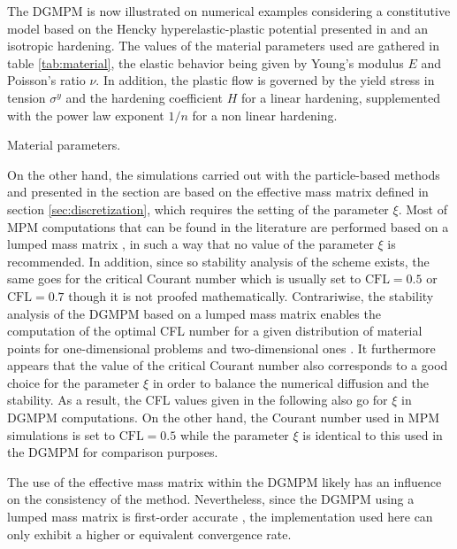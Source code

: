 The DGMPM is now illustrated on numerical examples considering a constitutive model based on the Hencky hyperelastic-plastic potential presented in \cite{Laurent2009} and an isotropic hardening. 
The values of the material parameters used are gathered in table \ref{tab:material}, the elastic behavior being given by Young's modulus $E$ and Poisson's ratio $\nu$. 
In addition, the plastic flow is governed by the yield stress in tension $\sigma^y$ and the hardening coefficient $H$ for a linear hardening, supplemented with the power law exponent $1/n$ for a non linear hardening.
\begin{table}[h!]
  \centering
  
  \caption{Material parameters.}
  \label{tab:material}
\end{table}

On the other hand, the simulations carried out with the particle-based methods and presented in the section are based on the effective mass matrix defined in section \ref{sec:discretization}, which requires the setting of the parameter $\xi$.
Most of MPM computations that can be found in the literature are performed based on a lumped mass matrix \cite{Sulsky94,Sulsky95,Silo_Wieckowski,Wieckowski,Sloshing_impact}, in such a way that no value of the parameter $\xi$ is recommended.
In addition, since so stability analysis of the scheme exists, the same goes for the critical Courant number which is usually set to $\text{CFL}=0.5$ or $\text{CFL}=0.7$ though it is not proofed mathematically.
Contrariwise, the stability analysis of the DGMPM based on a lumped mass matrix enables the computation of the optimal CFL number for a given distribution of material points for one-dimensional problems \cite{DGMPM} and two-dimensional ones \cite{DGMPM_stab}.
It furthermore appears that the value of the critical Courant number also corresponds to a good choice for the parameter $\xi$ in order to balance the numerical diffusion and the stability.
As a result, the CFL values given in the following also go for $\xi$ in DGMPM computations.
On the other hand, the Courant number used in MPM simulations is set to $\text{CFL}=0.5$ while the parameter $\xi$ is identical to this used in the DGMPM for comparison purposes. 

\begin{remark}
  The use of the effective mass matrix within the DGMPM likely has an influence on the consistency of the method.
  Nevertheless, since the DGMPM using a lumped mass matrix is first-order accurate \cite{Thesis}, the implementation used here can only exhibit a higher or equivalent convergence rate.
\end{remark}

